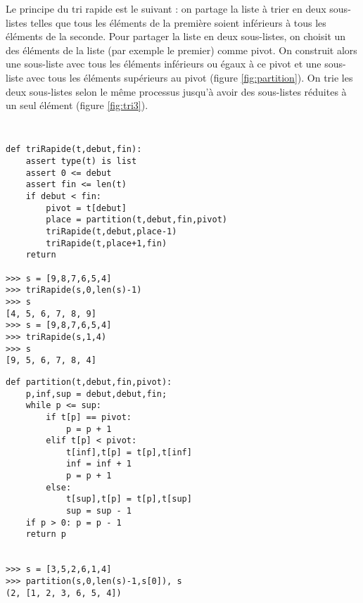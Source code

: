 {
}
Le principe du tri rapide  est le suivant : on partage la 
liste à trier en deux sous-listes telles que tous les éléments de la première 
soient inférieurs à tous les éléments de la seconde.
Pour partager la liste en deux sous-listes, on choisit un des éléments de la liste
(par exemple le premier) comme pivot. On construit alors une sous-liste
avec tous les éléments inférieurs ou égaux à ce pivot et une sous-liste avec 
tous les éléments supérieurs au pivot (figure \ref{fig:partition}).
On trie les deux sous-listes selon le même processus jusqu'à avoir des sous-listes 
réduites à un seul élément (figure \ref{fig:tri3}).

\noindent\mbox{}\hspace*{1cm}\begin{py}{8cm}\tt
\begin{verbatim}
def triRapide(t,debut,fin):
    assert type(t) is list
    assert 0 <= debut 
    assert fin <= len(t)
    if debut < fin:
        pivot = t[debut]
        place = partition(t,debut,fin,pivot)
        triRapide(t,debut,place-1)
        triRapide(t,place+1,fin)
    return
    
>>> s = [9,8,7,6,5,4]
>>> triRapide(s,0,len(s)-1)
>>> s
[4, 5, 6, 7, 8, 9]
>>> s = [9,8,7,6,5,4]
>>> triRapide(s,1,4)
>>> s
[9, 5, 6, 7, 8, 4]
\end{verbatim}
\end{py}
\hfill
\begin{py}{7cm}
\begin{verbatim}
def partition(t,debut,fin,pivot):
    p,inf,sup = debut,debut,fin;
    while p <= sup:
        if t[p] == pivot: 
            p = p + 1
        elif t[p] < pivot:
            t[inf],t[p] = t[p],t[inf]
            inf = inf + 1
            p = p + 1
        else:
            t[sup],t[p] = t[p],t[sup]
            sup = sup - 1
    if p > 0: p = p - 1
    return p


>>> s = [3,5,2,6,1,4]
>>> partition(s,0,len(s)-1,s[0]), s
(2, [1, 2, 3, 6, 5, 4])
\end{verbatim}
\end{py}

